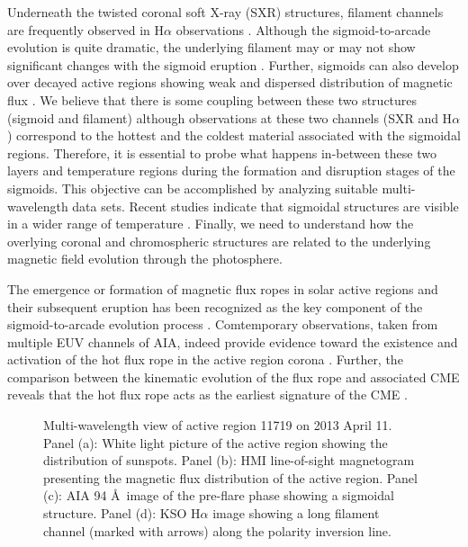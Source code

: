 \documentclass[twocolumn]{aastex6}
\begin{document}
Underneath the twisted coronal soft X-ray (SXR) structures, filament channels are frequently observed in H$\alpha$ observations \citep{Pevtsov1996, Pevtsov2002, Gibson2002}. Although the sigmoid-to-arcade evolution is quite dramatic, the underlying filament may or may not show significant changes with the sigmoid eruption \citep{Pevtsov2002}. Further, sigmoids can also develop over decayed active regions showing weak and dispersed distribution of magnetic flux \citep{Glover2001}. We believe that there is some coupling between these two structures (sigmoid and filament) although observations at these two channels (SXR and H$\alpha$) correspond to the hottest and the coldest material associated with the sigmoidal regions. Therefore, it is essential to probe what happens in-between these two layers and temperature regions during the formation and disruption stages of the sigmoids. This objective can be accomplished by analyzing suitable multi-wavelength data sets. Recent studies indicate that sigmoidal structures are visible in a wider range of temperature \citep{Liu2007}. Finally, we need to understand how the overlying coronal and chromospheric structures are related to the underlying magnetic field evolution through the photosphere.

The emergence or formation of magnetic flux ropes in solar active regions and their subsequent eruption has been recognized as the key component of the sigmoid-to-arcade evolution process \citep[see, e.g.,][]{Titov1999,Kliem2004, Archontis2009,Chatterjee2013,Schmieder2015,Jiang2016,Kumar2016}. Comtemporary observations, taken from multiple EUV channels of AIA, indeed provide evidence toward the existence and activation of the hot flux rope in the active region corona \citep[see, e.g.,][]{Cheng2011,ChengX2013_two_MFR, Kumar2014,ChenB2014, ChengX2016}. Further, the comparison between the kinematic evolution of the flux rope and associated CME reveals that the hot flux rope acts as the earliest signature of the CME \citep{Cheng2013_MRF_CME,Cheng2014_MFR_evol}.

\begin{figure*}
\caption{Multi-wavelength view of active region 11719 on 2013 April 11. Panel (a): White light picture of the active region showing the distribution of sunspots. Panel (b): HMI line-of-sight magnetogram presenting the magnetic flux distribution of the active region. Panel (c): AIA 94 \AA~image of the pre-flare phase showing a sigmoidal structure.  Panel (d): KSO H$\alpha$ image showing a long filament channel (marked with arrows) along the polarity inversion line.}
\label{fig1}
\end{figure*}
\end{document}
